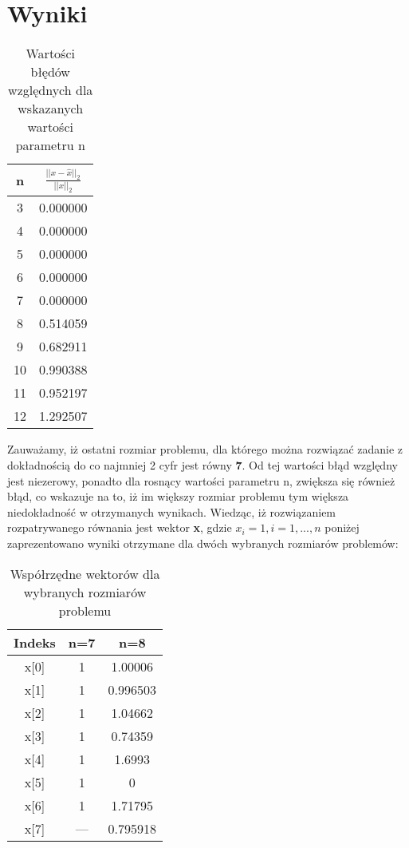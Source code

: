 \documentclass[a4paper,14pt]{report}
\begin{document}
\section{Wyniki}
    \begin{table}[H]
        \centering
        \begin{tabular}{|c | c |} 
        \hline
        n & $\frac{|| x - \hat x||_{2}}{|| x ||_{2}}$\\
        \hline
        3 & 0.000000\\
        4 & 0.000000\\
        5 & 0.000000\\
        6 & 0.000000\\
        7 & 0.000000\\
        8 & 0.514059\\
        9 & 0.682911\\
        10 & 0.990388\\
        11 & 0.952197\\
        12 & 1.292507\\
        \hline
        \end{tabular}
        \caption{Wartości błędów względnych dla wskazanych wartości parametru n}
    \end{table}
    Zauważamy, iż ostatni rozmiar problemu, dla którego można rozwiązać zadanie 
    z dokładnością do co najmniej 2 cyfr jest równy \textbf{7}. Od tej wartości błąd względny jest niezerowy,
    ponadto dla rosnący wartości parametru n, zwiększa się również błąd, co wskazuje na to, iż 
    im większy rozmiar problemu tym większa niedokładność w otrzymanych wynikach.
    Wiedząc, iż rozwiązaniem rozpatrywanego równania jest wektor \textbf{x}, gdzie $x_{i} = 1, i=1,...,n$ poniżej 
    zaprezentowano wyniki otrzymane dla dwóch wybranych rozmiarów problemów:
    \begin{table}[H]
        \centering
        \begin{tabular}{|c | c | c |} 
        \hline
        Indeks & n=7 & n=8\\
        \hline
        x[0] & 1 & 1.00006\\
        x[1] & 1 & 0.996503\\
        x[2] & 1 & 1.04662 \\
        x[3] & 1 & 0.74359 \\
        x[4] & 1 & 1.6993\\
        x[5] & 1 &  0\\
        x[6] & 1 & 1.71795\\
        x[7] & --- &  0.795918\\
        \hline
        \end{tabular}
        \caption{Współrzędne wektorów dla wybranych rozmiarów problemu}
    \end{table}
\end{document}
